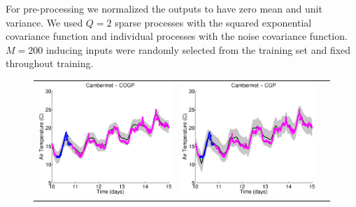 For pre-processing we normalized the outputs to have zero mean and unit variance.
We used $Q = 2$ sparse processes with the squared exponential covariance function and individual processes with the noise covariance function.
$M=200$  inducing inputs  were randomly selected from the training set and fixed throughout training.
%
\begin{figure}
\centering
\begin{tabular}{ccc}
\includegraphics[scale=0.3]{figures/cogp-weatherCambermet.eps} &
\includegraphics[scale=0.3]{figures/cgp-weatherCambermet.eps} &

\end{tabular}
\end{figure}
